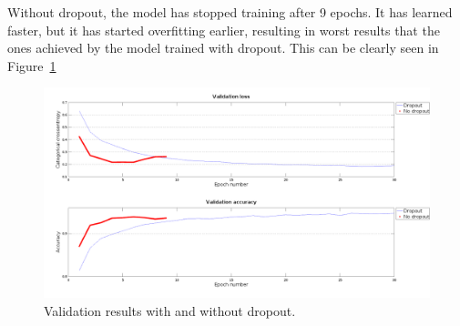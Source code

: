 Without dropout, the model has stopped training after 9 epochs. It has learned faster, but it has started overfitting earlier, resulting in worst results that the ones achieved by the model trained with dropout. This can be clearly seen in Figure~\ref{fig:comp_dropout}
\begin{figure}
	\centering
	\includegraphics[width=1\linewidth, keepaspectratio]{figures/comp_dropout.png}
	\caption{Validation results with and without dropout.}
	\label{fig:comp_dropout}
\end{figure}

